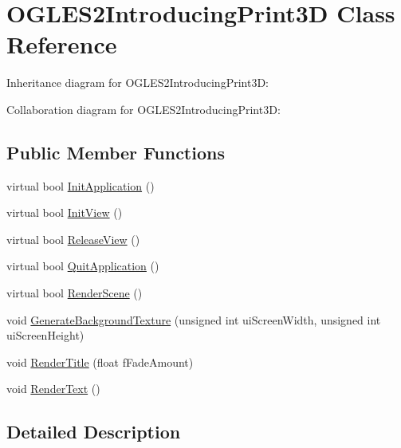 \hypertarget{class_o_g_l_e_s2_introducing_print3_d}{\section{O\+G\+L\+E\+S2\+Introducing\+Print3\+D Class Reference}
\label{class_o_g_l_e_s2_introducing_print3_d}
}


Inheritance diagram for O\+G\+L\+E\+S2\+Introducing\+Print3\+D\+:


Collaboration diagram for O\+G\+L\+E\+S2\+Introducing\+Print3\+D\+:
\subsection*{Public Member Functions}
\begin{DoxyCompactItemize}
\item 
virtual bool \hyperlink{class_o_g_l_e_s2_introducing_print3_d_ac63dd04dd03b97af17e228c826b21135}{Init\+Application} ()
\item 
virtual bool \hyperlink{class_o_g_l_e_s2_introducing_print3_d_a38d370bb4494d83809228bec1ea9a52f}{Init\+View} ()
\item 
virtual bool \hyperlink{class_o_g_l_e_s2_introducing_print3_d_ac248551ed7889ca896a512c668a41012}{Release\+View} ()
\item 
virtual bool \hyperlink{class_o_g_l_e_s2_introducing_print3_d_ae11a242725f49383f9fd09711fdcc502}{Quit\+Application} ()
\item 
virtual bool \hyperlink{class_o_g_l_e_s2_introducing_print3_d_ad5d79717c1e16789c24d0ac5d19e1649}{Render\+Scene} ()
\item 
void \hyperlink{class_o_g_l_e_s2_introducing_print3_d_ac62f6636a8b210469a82563270591058}{Generate\+Background\+Texture} (unsigned int ui\+Screen\+Width, unsigned int ui\+Screen\+Height)
\item 
void \hyperlink{class_o_g_l_e_s2_introducing_print3_d_ace817b33b9733946d8294c7974ccbfe0}{Render\+Title} (float f\+Fade\+Amount)
\item 
void \hyperlink{class_o_g_l_e_s2_introducing_print3_d_ae5ea6091a3022f952eab3070d868c2c4}{Render\+Text} ()
\end{DoxyCompactItemize}


\subsection{Detailed Description}


